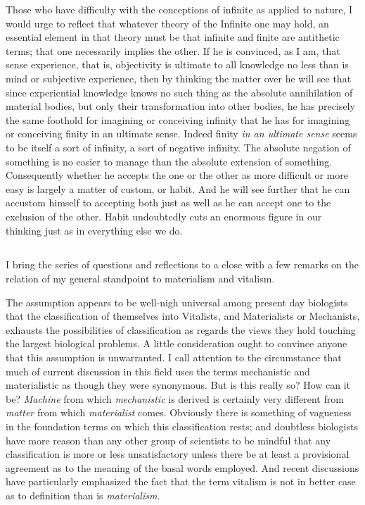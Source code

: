 \documentclass[a4paper, 11pt, oneside, polutonikogreek, english, landscape]{article}
\begin{document}
Those who have difficulty with the conceptions of infinite as applied to nature, I would urge to reflect that whatever theory of the Infinite one may hold, an essential element in that theory must be that infinite and finite are antithetic terms; that one necessarily implies the other. If he is convinced, as I am, that sense experience, that is, objectivity is ultimate to all knowledge no less than is mind or subjective experience, then by thinking the matter over he will see that since experiential knowledge knows no such thing as the absolute annihilation of material bodies, but only their transformation into other bodies, he has precisely the same foothold for imagining or conceiving infinity that he has for imagining or conceiving finity in an ultimate sense. Indeed finity \emph{in an ultimate sense} seems to be itself a sort of infinity, a sort of negative infinity. The absolute negation of something is no easier to manage than the absolute extension of something. Consequently whether he accepts the one or the other as more difficult or more easy is largely a matter of custom, or habit. And he will see further that he can accustom himself to accepting both just as well as he can accept one to the exclusion of the other. Habit undoubtedly cuts an enormous figure in our thinking just as in everything else we do.

\subsection{}
\paragraph{}
I bring the series of questions and reflections to a close with a few remarks on the relation of my general standpoint to materialism and vitalism.

The assumption appears to be well-nigh universal among present day biologists that the classification of themselves into Vitalists, and Materialists or Mechanists, exhausts the possibilities of classification as regards the views they hold touching the largest biological problems. A little consideration ought to convince anyone that this assumption is unwarranted. I call attention to the circumstance that much of current discussion in this field uses the terms mechanistic and materialistic as though they were synonymous. But is this really so? How can it be? \emph{Machine} from which \emph{mechanistic} is derived is certainly very different from \emph{matter} from which \emph{materialist} comes. Obviously there is something of vagueness in the foundation terms on which this classification rests; and doubtless biologists have more reason than any other group of scientists to be mindful that any classification is more or less unsatisfactory unless there be at least a provisional agreement as to the meaning of the basal words employed. And recent discussions have particularly emphasized the fact that the term vitalism is not in better case as to definition than is \emph{materialism}.
\end{document}
